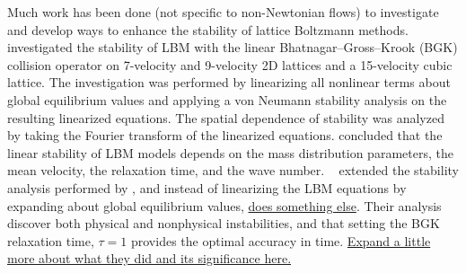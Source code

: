 \documentclass{article}
\begin{document}
Much work has been done (not specific to non-Newtonian flows) to investigate and develop ways to enhance the stability of lattice Boltzmann methods.
\citet{sterling1993stability,sterling1996stability} investigated the stability of LBM with the linear Bhatnagar--Gross--Krook (BGK) collision operator on 7-velocity and 9-velocity 2D lattices and a 15-velocity cubic lattice.
The investigation was performed by linearizing all nonlinear terms about global equilibrium values and applying a von Neumann stability analysis on the resulting linearized equations.
The spatial dependence of stability was analyzed by taking the Fourier transform of the linearized equations.
\citeauthor{sterling1993stability} concluded that the linear stability of LBM models depends on the mass distribution parameters, the mean velocity, the relaxation time, and the wave number. %
~\citet{worthing1997stability} extended the stability analysis performed by \citeauthor{sterling1993stability}, and instead of linearizing the LBM equations by expanding about global equilibrium values, \citeauthor{worthing1997stability} \ul{does something else}.
Their analysis discover both physical and nonphysical instabilities, and that setting the BGK relaxation time, $\tau = 1$ provides the optimal accuracy in time. %
\ul{Expand a little more about what they did and its significance here.}
\end{document}
